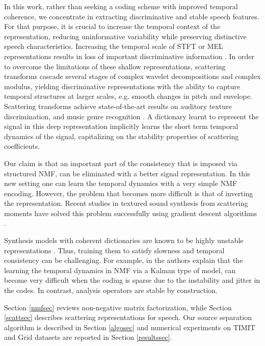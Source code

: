In this work, rather than seeking a coding scheme with improved temporal coherence, 
we concentrate in extracting discriminative and stable speech features. 
For that purpose, it is crucial to increase the temporal context of the representation, 
reducing uninformative variability while preserving distinctive speech characteristics.
Increasing the temporal scale of STFT or MEL representations results 
in loss of important discriminative information \cite{deepscatt}. 
In order to overcome the limitations of these shallow representations, 
scattering transforms \cite{deepscatt, pami} cascade several 
stages of complex wavelet decompositions and complex modulus, yielding 
discriminative representations with the ability to capture temporal structures at larger scales, 
e.g. smooth changes in pitch and envelope. 
Scattering transforms achieve state-of-the-art results on auditory texture discrimination, and music genre recognition \cite{deepscatt, phdjoan}.
A dictionary learnt to represent the signal in this deep representation implicitly learns the short term temporal dynamics of the signal,
capitalizing on the stability properties of scattering coefficients.


Our claim is that an important part of the consistency that is imposed via structured NMF, can be eliminated with a better signal representation.
In this new setting one can learn the temporal dynamics with a very simple NMF encoding. However, the problem that becomes
more difficult is that of inverting the representation. Recent studies in textured sound synthesis from scattering
moments have solved this problem successfully using gradient descent algorithms \cite{bruna2013audio}.

Synthesis models with coherent dictionaries are known to be highly unstable representations \cite{jenatton2012local}. 
Thus, training them to satisfy slowness and temporal consistency can be challenging. For example, in \cite{icassp13a}
the authors explain that the learning the temporal dynamics in NMF via a Kalman type of model, can become very difficult
when the coding is sparse due to the instability and jitter in the codes.
In contrast, analysis operators are stable by construction.

Section \ref{nmfsec} reviews non-negative matrix factorization, while Section \ref{scattsec} describes scattering 
representations for speech. Our source separation algorithm is described in Section \ref{algosec} and 
numerical experiments on TIMIT and Grid datasets are reported in Section \ref{resultssec}.





